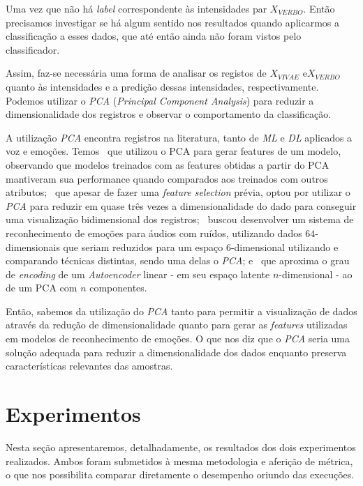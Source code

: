 Uma vez que não há \textit{label} correspondente às intensidades par $X_{VERBO}$. Então precisamos investigar se há algum sentido nos resultados quando aplicarmos a classificação a esses dados, que até então ainda não foram vistos pelo classificador.

Assim, faz-se necessária uma forma de analisar os registos de $X_{VIVAE}$ e$X_{VERBO}$ quanto às intensidades e a predição dessas intensidades, respectivamente. Podemos utilizar o \textit{PCA} (\textit{Principal Component Analysis}) para reduzir a dimensionalidade dos registros e observar o comportamento da classificação.

A utilização \textit{PCA} encontra registros na literatura, tanto de \textit{ML} e \textit{DL} aplicados a voz e emoções. Temos~\cite{pca1} que utilizou o PCA para gerar features de um modelo, observando que modelos treinados com as features obtidas a partir do PCA mantiveram sua performance quando comparados aos treinados com outros atributos;~\cite{pca2} que apesar de fazer uma \textit{feature selection} prévia, optou por utilizar o \textit{PCA} para reduzir em quase três vezes a dimensionalidade do dado para conseguir uma visualização bidimensional dos registros;~\cite{pca3} buscou desenvolver um sistema de reconhecimento de emoções para áudios com ruídos, utilizando dados $64$-dimensionais que seriam reduzidos para um espaço $6$-dimensional utilizando e comparando técnicas distintas, sendo uma delas o \textit{PCA}; e~\cite{pca5} que aproxima o grau de \textit{encoding} de um \textit{Autoencoder} linear - em seu espaço latente $n$-dimensional - ao de um PCA com $n$ componentes.

Então, sabemos  da utilização do \textit{PCA} tanto para permitir a visualização de dados através da redução de dimensionalidade quanto para gerar as \textit{features} utilizadas em modelos de reconhecimento de emoções. O que nos diz que o \textit{PCA} seria uma solução adequada para reduzir a dimensionalidade dos dados enquanto preserva características relevantes das amostras.


\section{Experimentos}

Nesta seção apresentaremos, detalhadamente, os resultados dos dois experimentos realizados. Ambos foram submetidos à mesma metodologia e aferição de métrica, o que nos possibilita comparar diretamente o desempenho oriundo das execuções.\\


